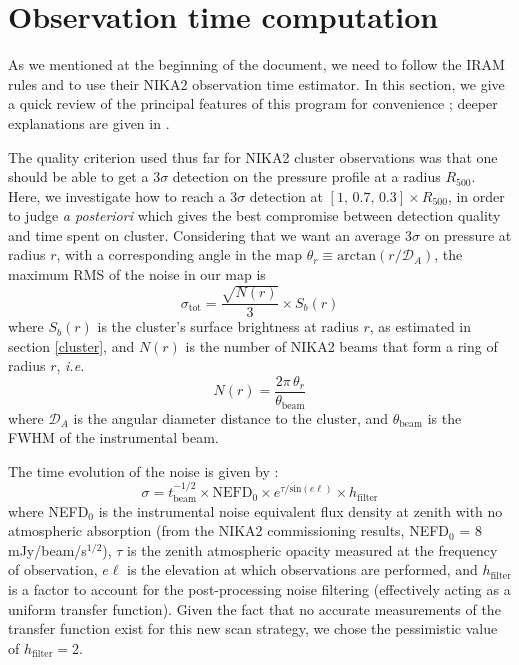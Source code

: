 \documentclass[11pt]{article}
\newcommand{\fh}{_{500}}
\begin{document}
\section{Observation time computation} \label{time}

As we mentioned at the beginning of the document, we need to follow the IRAM rules and to use their NIKA2 observation time estimator.
In this section, we give a quick review of the principal features of this program for convenience ; deeper explanations are given in \cite{Ladjelate2018}.

The quality criterion used thus far for NIKA2 cluster observations was that one should be able to get a $3\sigma$ detection on the pressure profile at a radius $R\fh$.
Here, we investigate how to reach a $3\sigma$ detection at $\left[1,\, 0.7,\, 0.3\right]\times R\fh$, in order to judge \textit{a posteriori} which gives the best compromise between detection quality and time spent on cluster.
Considering that we want an average $3\sigma$ on pressure at radius $r$, with a corresponding angle in the map $\theta_r \equiv \mathrm{arctan}(r/\mathcal{D}_A)$, the maximum RMS of the noise in our map is 
    \begin{equation}
        \sigma_\mathrm{tot} = \frac{\sqrt{N(r)}}{3} \times S_b(r)
        \label{eq:sigma}
    \end{equation}
where $S_b(r)$ is the cluster's surface brightness at radius $r$, as estimated in section \ref{cluster}, and $N(r)$ is the number of NIKA2 beams that form a ring of radius $r$, \textit{i.e.}
    \begin{equation}
        N(r) = \frac{2\pi\,\theta_r}{\theta_\mathrm{beam}}
    \end{equation}
where $\mathcal{D}_A$ is the angular diameter distance to the cluster, and $\theta_\mathrm{beam}$ is the FWHM of the instrumental beam.

The time evolution of the noise is given by :
    \begin{equation}
        \sigma = t_\mathrm{beam}^{-1/2} \times \mathrm{NEFD}_0 \times e^{\tau/\mathrm{sin}(e\ell)} \times h_\mathrm{filter}
    \end{equation}
where NEFD$_0$ is the instrumental noise equivalent flux density at zenith with no atmospheric absorption (from the NIKA2 commissioning results, NEFD$_0$ = 8 mJy/beam/s$^{1/2}$), $\tau$ is the zenith atmospheric opacity measured at the frequency of observation, $e\ell$ is the elevation at which observations are performed, and $h_\mathrm{filter}$ is a factor to account for the post-processing noise filtering (effectively acting as a uniform transfer function).
Given the fact that no accurate measurements of the transfer function exist for this new scan strategy, we chose the pessimistic value of $h_\mathrm{filter} = 2$.
\end{document}
